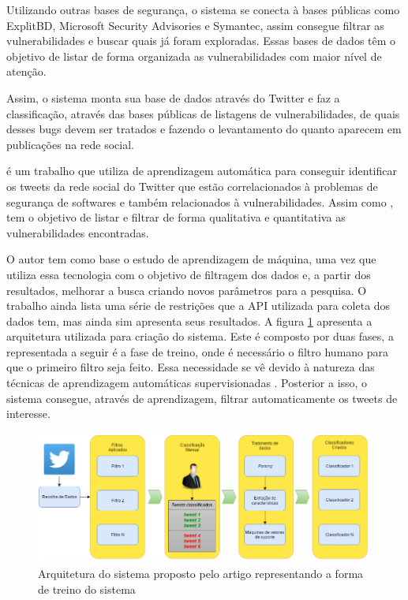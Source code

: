 Utilizando outras bases de segurança, o sistema se conecta à bases públicas como ExplitBD, Microsoft Security Advisories e Symantec, assim consegue filtrar as vulnerabilidades e buscar quais já foram exploradas. Essas bases de dados têm o objetivo de listar de forma organizada as vulnerabilidades com maior nível de atenção.

Assim, o sistema monta sua base de dados através do Twitter e faz a classificação, através das bases públicas de listagens de vulnerabilidades, de quais desses bugs devem ser tratados e fazendo o levantamento do quanto aparecem em publicações na rede social.

 é um trabalho que utiliza de aprendizagem automática para conseguir identificar os tweets da rede social do Twitter que estão correlacionados à problemas de segurança de softwares e também relacionados à vulnerabilidades. Assim como , tem o objetivo de listar e filtrar de forma qualitativa e quantitativa as vulnerabilidades encontradas.

O autor tem como base o estudo de aprendizagem de máquina, uma vez que utiliza essa tecnologia com o objetivo de filtragem dos dados e, a partir dos resultados, melhorar a busca criando novos parâmetros para a pesquisa. O trabalho ainda lista uma série de restrições que a API utilizada para coleta dos dados tem, mas ainda sim apresenta seus resultados. A figura \ref{fig:Correia} apresenta a arquitetura utilizada para criação do sistema. Este é composto por duas fases, a representada a seguir é a fase de treino, onde é necessário o filtro humano para que o primeiro filtro seja feito. Essa necessidade se vê devido à natureza das técnicas de aprendizagem automáticas supervisionadas \cite{Correia2016}. Posterior a isso, o sistema consegue, através de aprendizagem, filtrar automaticamente os tweets de interesse. 

\begin{figure}[H]
\centering
\includegraphics[width=1\textwidth]{imagens/Correia.png}
\caption{Arquitetura do sistema proposto pelo artigo  representando a forma de treino do sistema}
\label{fig:Correia}
\end{figure}


